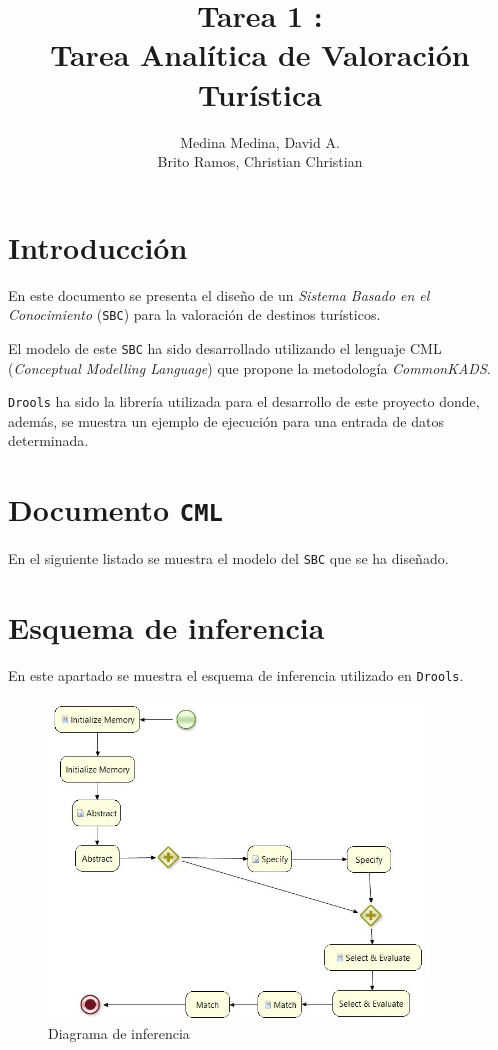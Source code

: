 \documentclass[10pt,a4paper]{report}
\author{Medina Medina, David A.
	\\Brito Ramos, Christian
	Christian}
\title{Tarea 1 :\\ Tarea Analítica de Valoración Turística}
\begin{document}
	\maketitle
	\tableofcontents
	
	\chapter{Introducción}
	En este documento se presenta el diseño de un \textit{Sistema Basado en el Conocimiento} (\texttt{SBC}) para la valoración de destinos turísticos.
	
	El modelo de este \texttt{SBC} ha sido desarrollado utilizando el lenguaje CML (\textit{Conceptual Modelling Language}) que propone la metodología \textit{CommonKADS}.
	
	\texttt{Drools} ha sido la librería utilizada para el desarrollo de este proyecto donde, además, se muestra un ejemplo de ejecución para una entrada de datos determinada.
	
	\chapter{Documento \texttt{CML}}
	En el siguiente listado se muestra el modelo del \texttt{SBC} que se ha diseñado.
	
	
	\chapter{Esquema de inferencia}\label{chap:esquema}
	En este apartado se muestra el esquema de inferencia utilizado en \texttt{Drools}.
		
	\begin{figure}[h]
		\centering
		\includegraphics[width=0.9\textwidth]{esquema.jpg}
		\caption{Diagrama de inferencia}
	\end{figure}
	
\end{document}
